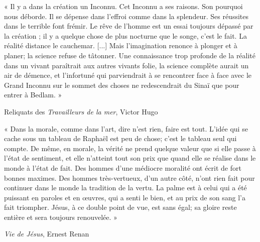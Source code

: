 \documentclass{article}
\begin{document}
\begin{center} « Il y a dans la création un Inconnu. Cet Inconnu a ses raisons. Son pourquoi nous déborde. Il se dépense dans l'effroi comme dans la splendeur. Ses réussites dans le terrible font frémir. Le rêve de l'homme est un essai toujours dépassé par la création ; il y a quelque chose de plus nocturne que le songe, c'est le fait. La réalité distance le cauchemar. [...] Mais l'imagination renonce à plonger et à planer; la science refuse de tâtonner. Une connaissance trop profonde de la réalité dans un vivant paraîtrait aux autres vivants folie, la science complète aurait un air de démence, et l'infortuné qui parviendrait à se rencontrer face à face avec le Grand Inconnu sur le sommet des choses ne redescendrait du Sinaï que pour entrer à Bedlam. » \end{center}

\begin{flushright}Reliquats des \textit{Travailleurs de la mer}, Victor Hugo\end{flushright}
\vspace{8pt}

\begin{center} « Dans la morale, comme dans l'art, dire n'est rien, faire est tout. L'idée qui se cache sous un tableau de Raphaël est peu de chose; c'est le tableau seul qui compte. De même, en morale, la vérité ne prend quelque valeur que si elle passe à l'état de sentiment, et elle n'atteint tout son prix que quand elle se réalise dans le monde à l'état de fait. Des hommes d'une médiocre moralité ont écrit de fort bonnes maximes. Des hommes très-vertueux, d'un autre côté, n'ont rien fait pour continuer dans le monde la tradition de la vertu. La palme est à celui qui a été puissant en paroles et en œuvres, qui a senti le bien, et au prix de son sang l'a fait triompher. Jésus, à ce double point de vue, est sans égal; sa gloire reste entière et sera toujours renouvelée. » \end{center}

\begin{flushright}\textit{Vie de Jésus}, Ernest Renan\end{flushright}
\end{document}
